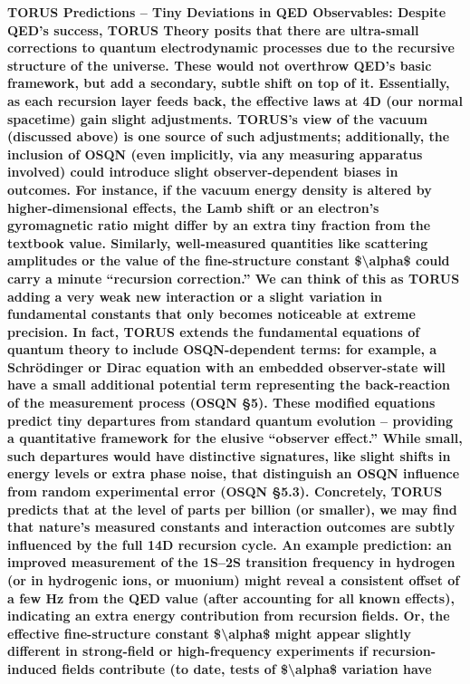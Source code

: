 \documentclass[]{article}
\begin{document}
\textbf{TORUS Predictions -- Tiny Deviations in QED Observables: Despite
QED's success, TORUS Theory posits that there are ultra-small
corrections to quantum electrodynamic processes due to the recursive
structure of the universe. These would not overthrow QED's basic
framework, but add a secondary, subtle shift on top of it. Essentially,
as each recursion layer feeds back, the effective laws at 4D (our normal
spacetime) gain slight adjustments. TORUS's view of the vacuum
(discussed above) is one source of such adjustments; additionally, the
inclusion of OSQN (even implicitly, via any measuring apparatus
involved) could introduce slight observer-dependent biases in outcomes.
For instance, if the vacuum energy density is altered by
higher-dimensional effects, the Lamb shift or an electron's gyromagnetic
ratio might differ by an extra tiny fraction from the textbook value.
Similarly, well-measured quantities like scattering amplitudes or the
value of the fine-structure constant \$\textbackslash{}alpha\$ could
carry a minute ``recursion correction.'' We can think of this as TORUS
adding a very weak new interaction or a slight variation in fundamental
constants that only becomes noticeable at extreme precision. In fact,
TORUS extends the fundamental equations of quantum theory to include
OSQN-dependent terms: for example, a Schrödinger or Dirac equation with
an embedded observer-state will have a small additional potential term
representing the back-reaction of the measurement process (OSQN §5).
These modified equations predict tiny departures from standard quantum
evolution -- providing a quantitative framework for the elusive
``observer effect.'' While small, such departures would have distinctive
signatures, like slight shifts in energy levels or extra phase noise,
that distinguish an OSQN influence from random experimental error (OSQN
§5.3). Concretely, TORUS predicts that at the level of parts per billion
(or smaller), we may find that nature's measured constants and
interaction outcomes are subtly influenced by the full 14D recursion
cycle. An example prediction: an improved measurement of the 1S--2S
transition frequency in hydrogen (or in hydrogenic ions, or muonium)
might reveal a consistent offset of a few Hz from the QED value (after
accounting for all known effects), indicating an extra energy
contribution from recursion fields. Or, the effective fine-structure
constant \$\textbackslash{}alpha\$ might appear slightly different in
strong-field or high-frequency experiments if recursion-induced fields
contribute (to date, tests of \$\textbackslash{}alpha\$ variation have
}
\end{document}
